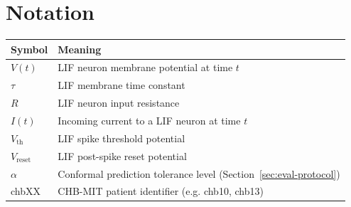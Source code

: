 \section*{Notation}
\begin{table}[H]
\centering
\begin{tabular}{ll}
\toprule
Symbol & Meaning \\
\midrule
$V(t)$ & LIF neuron membrane potential at time $t$ \\
$\tau$ & LIF membrane time constant \\
$R$ & LIF neuron input resistance \\
$I(t)$ & Incoming current to a LIF neuron at time $t$ \\
$V_{\text{th}}$ & LIF spike threshold potential \\
$V_{\text{reset}}$ & LIF post-spike reset potential \\
$\alpha$ & Conformal prediction tolerance level (Section~\ref{sec:eval-protocol}) \\
chbXX & CHB-MIT patient identifier (e.g. chb10, chb13) \\
\bottomrule
\end{tabular}
\end{table}